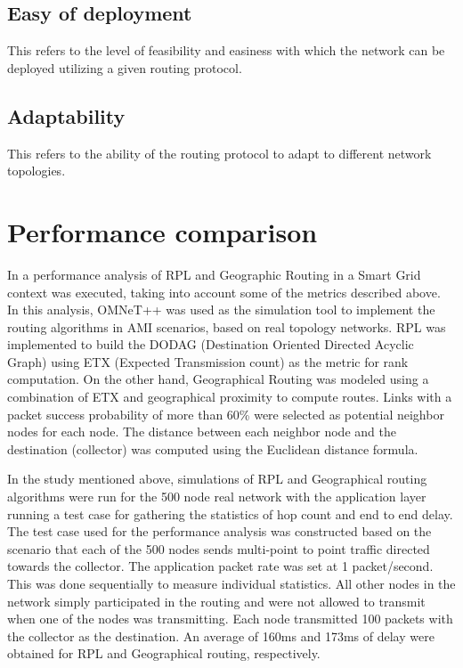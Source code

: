 \documentclass[11pt,final,onecolumn]{IEEEtran}
\begin{document}
\subsection{Easy of deployment}
This refers to the level of feasibility and easiness with which the network can be deployed utilizing a given routing protocol.  

\subsection{Adaptability}
This refers to the ability of the routing protocol to adapt to different network topologies. 

\section{Performance comparison}

In \cite{Iyer2011a} a performance analysis of RPL and Geographic Routing in a Smart Grid context was executed, taking into account some of the metrics described above. In this analysis,  OMNeT++ was used as the simulation tool to implement the routing algorithms in AMI scenarios, based on real topology networks. RPL was implemented to build the DODAG (Destination Oriented Directed Acyclic Graph) using ETX (Expected Transmission count) as the metric for rank computation. On the other hand, Geographical Routing was modeled using a combination of ETX and geographical proximity to compute routes. Links with a packet success probability of more than 60\% were selected as potential neighbor nodes for each node. The distance between each neighbor node and the destination (collector) was computed using the Euclidean distance formula.  

In the study mentioned above, simulations of RPL and Geographical routing algorithms were run for the 500 node real network with the application layer running a test case for gathering the statistics of hop count and end to end delay. The test case used for the performance analysis was constructed based on the scenario that each of the 500 nodes sends multi-point to point traffic directed towards the collector. The application packet rate was set at 1 packet/second. This was done sequentially to measure individual statistics. All other nodes in the network simply participated in the routing and were not allowed to transmit when one of the nodes was transmitting. Each node transmitted 100 packets with the collector as the destination. An average of 160ms and 173ms of delay were obtained for RPL and Geographical routing, respectively. 
\end{document}
